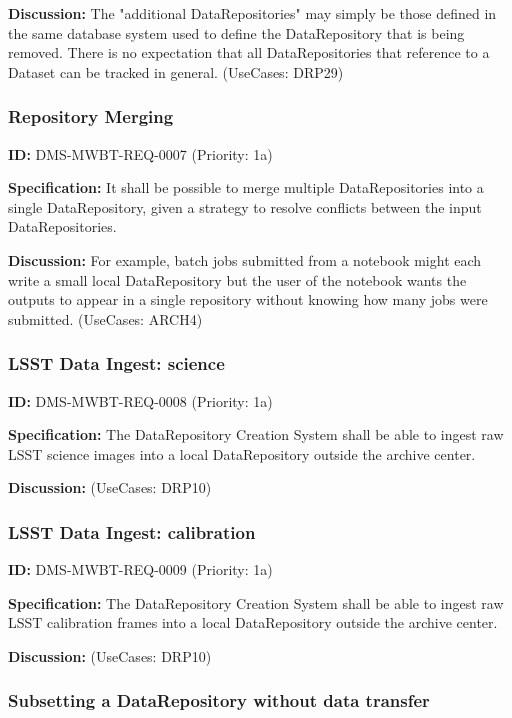 \documentclass[SE,toc,lsstdraft]{lsstdoc}
\begin{document}
\textbf{Discussion:}
The "additional DataRepositories" may simply be those defined in the same database system used to define the DataRepository that is being removed. There is no expectation that all DataRepositories that reference to a Dataset can be tracked in general. (UseCases: DRP29)

\subsubsection{Repository Merging}

\label{DMS-MWBT-REQ-0007}
\textbf{ID:} DMS-MWBT-REQ-0007 (Priority: 1a)

\textbf{Specification:}
It shall be possible to merge multiple DataRepositories into a single DataRepository, given a strategy to resolve conflicts between the input DataRepositories.

\textbf{Discussion:}
For example, batch jobs submitted from a notebook might each write a small local DataRepository but the user of the notebook wants the outputs to appear in a single repository without knowing how many jobs were submitted. (UseCases: ARCH4)

\subsubsection{LSST Data Ingest: science}

\label{DMS-MWBT-REQ-0008}
\textbf{ID:} DMS-MWBT-REQ-0008 (Priority: 1a)

\textbf{Specification:}
The DataRepository Creation System shall be able to ingest raw LSST science images into a local DataRepository outside the archive center.

\textbf{Discussion:}
(UseCases: DRP10)

\subsubsection{LSST Data Ingest: calibration}

\label{DMS-MWBT-REQ-0009}
\textbf{ID:} DMS-MWBT-REQ-0009 (Priority: 1a)

\textbf{Specification:}
The DataRepository Creation System shall be able to ingest raw LSST calibration frames into a local DataRepository outside the archive center.

\textbf{Discussion:}
(UseCases: DRP10)

\subsubsection{Subsetting a DataRepository without data transfer}
\end{document}

